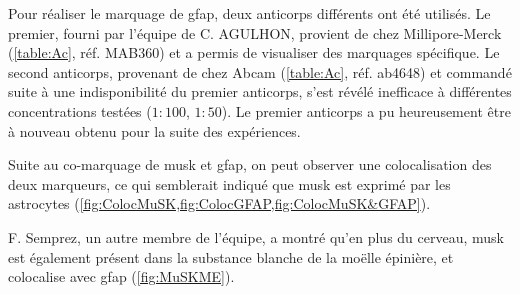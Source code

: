	Pour réaliser le marquage de \gls{gfap}, deux anticorps différents ont été utilisés. Le premier, fourni par l'équipe de C. AGULHON, provient de chez Millipore-Merck (\cref{table:Ac}, réf. MAB360) et a permis de visualiser des marquages spécifique. Le second anticorps, provenant de chez Abcam (\cref{table:Ac}, réf. ab4648) et commandé suite à une indisponibilité du premier anticorps, s'est révélé inefficace à différentes concentrations testées ($1{:}100$, $1{:}50$). Le premier anticorps a pu heureusement être à nouveau obtenu pour la suite des expériences.
	
	Suite au co-marquage de \gls{musk} et \gls{gfap}, on peut observer une colocalisation des deux marqueurs, ce qui semblerait indiqué que \gls{musk} est exprimé par les astrocytes (\cref{fig:ColocMuSK,fig:ColocGFAP,fig:ColocMuSK&GFAP}). 
	
	F. Semprez, un autre membre de l'équipe, a montré qu'en plus du cerveau, \gls{musk} est également présent dans la substance blanche de la moëlle épinière, et colocalise avec \gls{gfap} (\cref{fig:MuSKME}).
	
